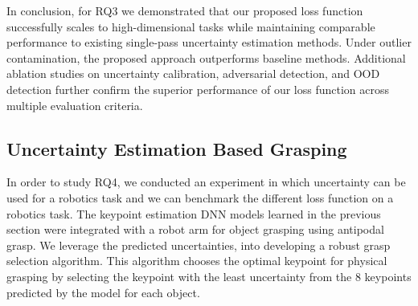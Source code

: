 \documentclass[letterpaper, 10 pt, conference]{ieeeconf}  %
\begin{document}
In conclusion, for RQ3 we demonstrated that our proposed loss function successfully scales to high-dimensional tasks while maintaining comparable performance to existing single-pass uncertainty estimation methods. Under outlier contamination, the proposed approach outperforms baseline methods. Additional ablation studies on uncertainty calibration, adversarial detection, and OOD detection further confirm the superior performance of our loss function across multiple evaluation criteria.
 
\subsection{Uncertainty Estimation Based Grasping}
In order to study RQ4, we conducted an experiment in which uncertainty can be used for a robotics task and we can benchmark the different loss function on a robotics task. The keypoint estimation DNN models learned in the previous section were integrated with a robot arm for object grasping using antipodal grasp. We leverage the predicted uncertainties, into developing a robust grasp selection algorithm. This algorithm chooses the optimal keypoint for physical grasping by selecting the keypoint with the least uncertainty from the 8 keypoints predicted by the model for each object.
\end{document}
